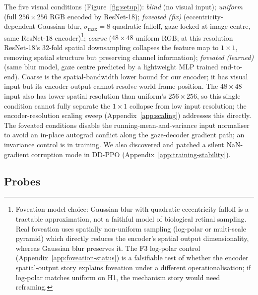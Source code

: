 \documentclass{article}
\newcommand{\hcpending}[1]{{\color{hcpendingcol}#1}}
\begin{document}
The five visual conditions (Figure~\ref{fig:setup}): \emph{blind} (no visual input); \emph{uniform} (full $256{\times}256$ RGB encoded by ResNet-18); \emph{foveated (fix)} (eccentricity-dependent Gaussian blur, $\sigma_{\max}=8$ quadratic falloff, gaze locked at image centre, same ResNet-18 encoder)\footnote{\small Foveation-model choice: Gaussian blur with quadratic eccentricity falloff is a tractable approximation, not a faithful model of biological retinal sampling. Real foveation uses spatially non-uniform sampling (log-polar or multi-scale pyramid) which directly reduces the encoder's spatial output dimensionality, whereas Gaussian blur preserves it. \hcpending{The F3 log-polar control (Appendix~\ref{app:foveation-status}) is a falsifiable test of whether the encoder spatial-output story explains foveation under a different operationalisation; if log-polar matches uniform on H1, the mechanism story would need reframing.}}; \emph{coarse} ($48{\times}48$ uniform RGB; at this resolution ResNet-18's 32-fold spatial downsampling collapses the feature map to $1{\times}1$, removing spatial structure but preserving channel information); \emph{foveated (learned)} (same blur model, gaze centre predicted by a lightweight MLP trained end-to-end). Coarse is the spatial-bandwidth lower bound for our encoder; it has visual input but its encoder output cannot resolve world-frame position. The $48{\times}48$ input also has lower spatial resolution than uniform's $256{\times}256$, so this single condition cannot fully separate the $1{\times}1$ collapse from low input resolution; the encoder-resolution scaling sweep (Appendix~\ref{app:scaling}) addresses this directly. The foveated conditions disable the running-mean-and-variance input normaliser to avoid an in-place autograd conflict along the gaze-decoder gradient path; an invariance control is in training. We also discovered and patched a silent NaN-gradient corruption mode in DD-PPO (Appendix~\ref{app:training-stability}).

\subsection{Probes}
\label{sec:methods-probes}
\end{document}

